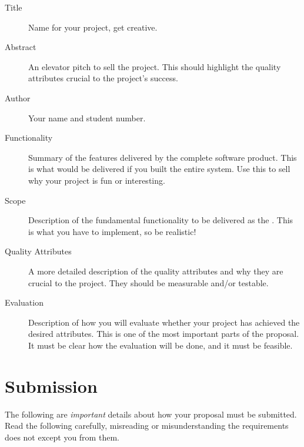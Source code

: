 \documentclass{csse4400}
\begin{document}
\begin{description}
    \item[Title] Name for your project, get creative.
    \item[Abstract] An elevator pitch to sell the project.
                    This should highlight the quality attributes crucial to the project's success.
    \item[Author] Your name and student number.
    \item[Functionality] Summary of the features delivered by the complete software product.
                         This is what would be delivered if you built the entire system.
                         Use this to sell why your project is fun or interesting.
    \item[Scope] Description of the fundamental functionality to be delivered as the .
                 This is what you have to implement, so be realistic!
    \item[Quality Attributes] A more detailed description of the quality attributes and why they are crucial to the project.
                              They should be measurable and/or testable.
    \item[Evaluation] Description of how you will evaluate whether your project has achieved the desired attributes.
                      This is one of the most important parts of the proposal.
                      It must be clear how the evaluation will be done, and it must be feasible.
\end{description}


\section{Submission}

The following are \emph{important} details about how your proposal must be submitted.
Read the following carefully, misreading or misunderstanding the requirements does not except you from them.
\end{document}

